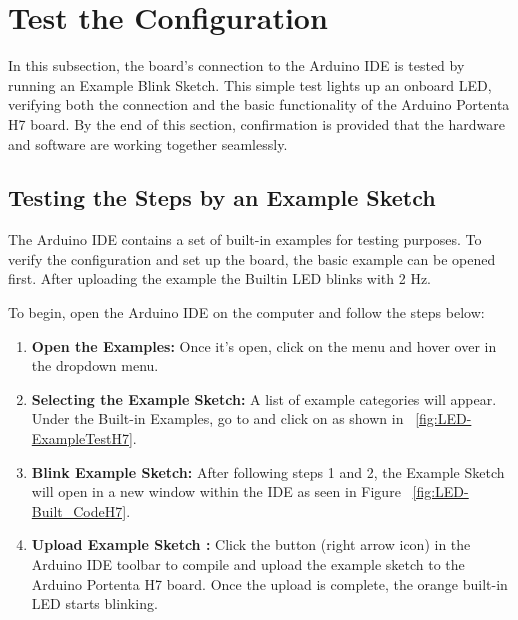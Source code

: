 \section{Test the Configuration}


In this subsection, the board's connection to the Arduino IDE is tested by running an Example Blink Sketch. This simple test lights up an onboard LED, verifying both the connection and the basic functionality of the Arduino Portenta H7 board. By the end of this section, confirmation is provided that the hardware and software are working together seamlessly.

\subsection{Testing the Steps by an Example Sketch }


The Arduino IDE contains a set of built-in examples for testing purposes. To verify the configuration and set up the board, the basic example  can be opened first. After uploading the example  the Builtin LED blinks with 2 Hz. 


To begin, open the Arduino IDE on the computer and follow the steps below:

\begin{enumerate}
	
	
	
	\item \textbf{Open the Examples:} Once it's open, click on the  menu and hover over  in the dropdown menu. 
	
	\item \textbf{Selecting the Example Sketch:} A list of example categories will appear. Under the Built-in Examples, go to  and click on  as shown in ~\ref{fig:LED-ExampleTestH7}.
	
	\item \textbf{Blink Example Sketch:} After following steps 1 and 2, the  Example Sketch  will open in a new window within the IDE as seen in Figure ~\ref{fig:LED-Built_CodeH7}.
	
	\item \textbf{Upload Example Sketch :} Click the  button (right arrow icon) in the Arduino IDE toolbar to compile and upload the example sketch to the Arduino Portenta H7 board. Once the upload is complete, the orange built-in LED starts blinking. 
	
	
	
\end{enumerate}


